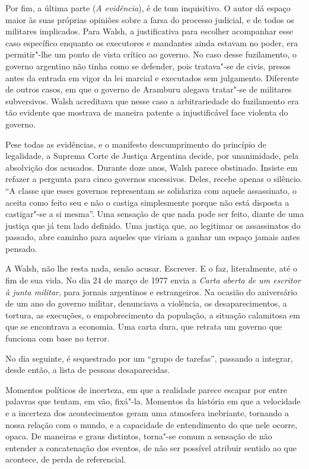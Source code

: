 Por fim, a última parte (\emph{A evidência}), é de tom inquisitivo. O
autor dá espaço maior às suas próprias opiniões sobre a farsa do
processo judicial, e de todos os militares implicados. Para Walsh, a
justificativa para escolher acompanhar esse caso específico enquanto os
executores e mandantes ainda estavam no poder, era permitir"-lhe
um ponto de vista crítico ao governo. No caso desse fuzilamento, o
governo argentino não tinha como se defender, pois tratava"-se de civis,
presos antes da entrada em vigor da lei marcial e executados sem
julgamento. Diferente de outros casos, em que o governo de Aramburu
alegava tratar"-se de militares subversivos. Walsh acreditava que nesse
caso a arbitrariedade do fuzilamento era tão evidente que mostrava de
maneira patente a injustificável face violenta do governo.

Pese todas as
evidências, e o manifesto descumprimento do princípio de legalidade, a
Suprema Corte de Justiça Argentina decide, por unanimidade, pela
absolvição dos acusados. Durante doze anos, Walsh parece obstinado.
Insiste em refazer a pergunta para cinco governos sucessivos. Deles,
recebe apenas o silêncio. ``A classe que esses governos representam se
solidariza com aquele assassinato, o aceita como feito seu e não o
castiga simplesmente porque não está disposta a castigar"-se a si
mesma''. Uma sensação de que nada pode ser feito, diante de uma justiça
que já tem lado definido. Uma justiça que, ao legitimar os assassinatos
do passado, abre caminho para aqueles que viriam a ganhar um espaço
jamais antes pensado.

A Walsh, não lhe resta nada, senão acusar. Escrever. E o faz,
literalmente, até o fim de sua vida. No dia 24 de março de 1977 envia a
\emph{Carta aberta de um escritor à junta militar}, para jornais
argentinos e estrangeiros. Na ocasião do aniversário de um ano do
governo militar, denunciava a violência, os desaparecimentos, a tortura,
as execuções, o empobrecimento da população, a situação calamitosa em
que se encontrava a economia. Uma carta dura, que retrata um governo que funciona com
base no terror.

No dia seguinte, é sequestrado por um ``grupo de tarefas'', passando a
integrar, desde então, a lista de pessoas desaparecidas.

\asterisc

Momentos políticos de incerteza, em que a realidade parece escapar por
entre palavras que tentam, em vão, fixá"-la. Momentos da história em que
a velocidade e a incerteza dos acontecimentos geram uma atmosfera
inebriante, tornando a nossa relação com o mundo, e a capacidade de
entendimento do que nele ocorre, opaca. De maneiras e graus distintos,
torna"-se comum a sensação de não entender a concatenação dos eventos, de
não ser possível atribuir sentido ao que acontece, de perda de
referencial.

